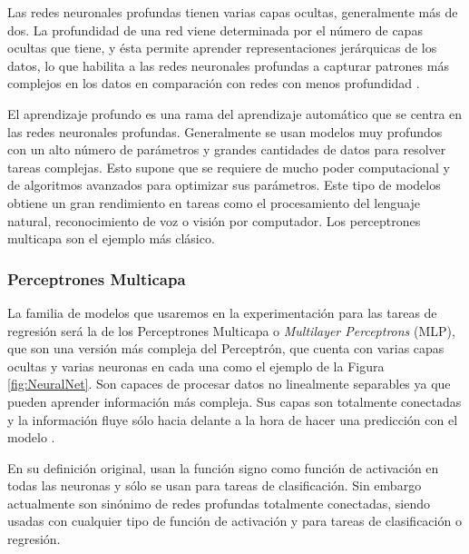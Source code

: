 Las redes neuronales profundas tienen varias capas ocultas, generalmente más de dos. La profundidad de una red viene determinada por el número de capas ocultas que tiene, y ésta permite aprender representaciones jerárquicas de los datos, lo que habilita a las redes neuronales profundas a capturar patrones más complejos en los datos en comparación con redes con menos profundidad \cite{stanford_231}.

El aprendizaje profundo es una rama del aprendizaje automático que se centra en las redes neuronales profundas. Generalmente se usan modelos muy profundos con un alto número de parámetros y grandes cantidades de datos para resolver tareas complejas. Esto supone que se requiere de mucho poder computacional y de algoritmos avanzados para optimizar sus parámetros. Este tipo de modelos obtiene un gran rendimiento en tareas como el procesamiento del lenguaje natural, reconocimiento de voz o visión por computador. Los perceptrones multicapa son el ejemplo más clásico.





\subsubsection{Perceptrones Multicapa}

La familia de modelos que usaremos en la experimentación para las tareas de regresión será la de los Perceptrones Multicapa o \textit{Multilayer Perceptrons} (MLP), que son una versión más compleja del Perceptrón, que cuenta con varias capas ocultas y varias neuronas en cada una como el ejemplo de la Figura \ref{fig:NeuralNet}. Son capaces de procesar datos no linealmente separables ya que pueden aprender información más compleja. Sus capas son totalmente conectadas y la información fluye sólo hacia delante a la hora de hacer una predicción con el modelo \cite{GoodFellowBook}. 

En su definición original, usan la función signo como función de activación en todas las neuronas y sólo se usan para tareas de clasificación. Sin embargo actualmente son sinónimo de redes profundas totalmente conectadas, siendo usadas con cualquier tipo de función de activación y para tareas de clasificación o regresión.

